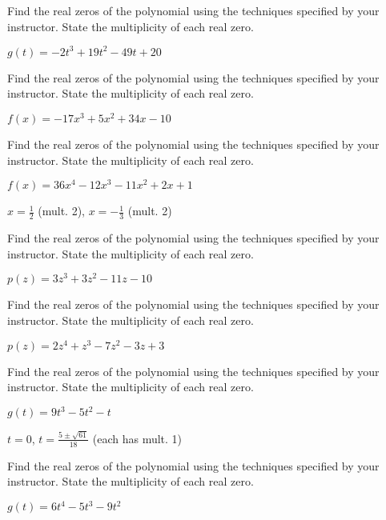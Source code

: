 \documentclass{ximera}
\begin{document}
\begin{problem}
Find the real zeros of the polynomial using the techniques specified by your instructor.  State the multiplicity of each real zero.

$g(t) = -2t^{3} + 19t^{2} - 49t + 20$
\end{problem}

\begin{problem}
Find the real zeros of the polynomial using the techniques specified by your instructor.  State the multiplicity of each real zero.

$f(x) = -17x^{3} + 5x^{2} + 34x - 10$
\end{problem}

\begin{problem}
Find the real zeros of the polynomial using the techniques specified by your instructor.  State the multiplicity of each real zero.

$f(x) = 36x^{4} - 12x^{3} - 11x^{2} + 2x + 1$

\begin{solution}
$x = \frac{1}{2}$ (mult. 2), $x = -\frac{1}{3}$ (mult. 2) 
\end{solution}
\end{problem}

\begin{problem}
Find the real zeros of the polynomial using the techniques specified by your instructor.  State the multiplicity of each real zero.

$p(z) = 3z^{3} + 3z^{2} - 11z - 10$
\end{problem}

\begin{problem}
Find the real zeros of the polynomial using the techniques specified by your instructor.  State the multiplicity of each real zero.

$p(z) = 2z^4+z^3-7z^2-3z+3$
\end{problem}

\begin{problem}
Find the real zeros of the polynomial using the techniques specified by your instructor.  State the multiplicity of each real zero.

$g(t) = 9t^{3} - 5t^{2} - t$

\begin{solution}
$t = 0$, $t = \frac{5 \pm \sqrt{61}}{18}$ (each has mult. 1)
\end{solution}
\end{problem}

\begin{problem}
Find the real zeros of the polynomial using the techniques specified by your instructor.  State the multiplicity of each real zero.

$g(t) = 6t^{4} - 5t^{3} - 9t^{2}$
\end{problem}
\end{document}
